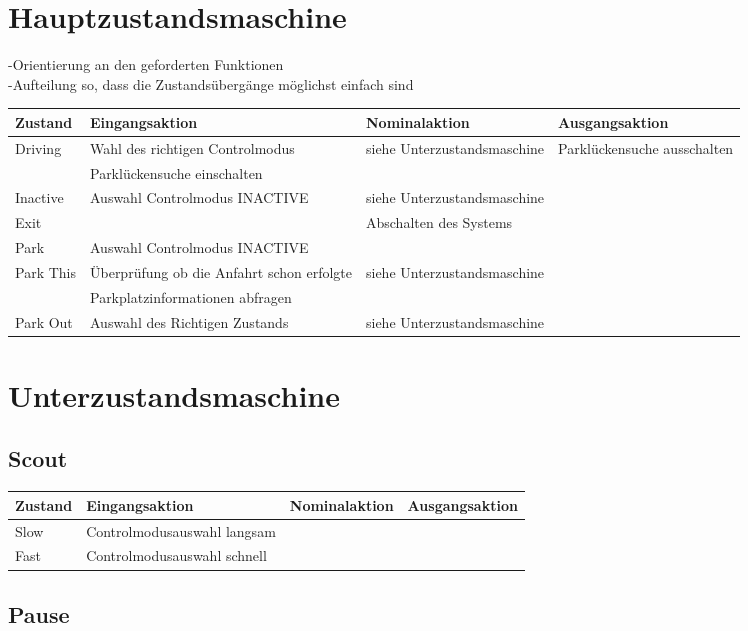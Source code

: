 \section{Hauptzustandsmaschine}
-Orientierung an den geforderten Funktionen\\
-Aufteilung so, dass die Zustandsübergänge möglichst einfach sind\\
%
\begin{tabular}{|p{1.5cm}|p{4cm}|p{4cm}|p{3cm}|}
	\hline 
	Zustand & Eingangsaktion & Nominalaktion & Ausgangsaktion \\ 
	\hline 
	Driving & Wahl des richtigen Controlmodus & siehe Unterzustandsmaschine & Parklückensuche ausschalten \\ 
	\hline 
	 & Parklückensuche einschalten &  &  \\ 
	\hline
	Inactive & Auswahl Controlmodus INACTIVE & siehe Unterzustandsmaschine &  \\ 
	\hline 
	Exit &  & Abschalten des Systems &  \\ 
	\hline
	Park & Auswahl Controlmodus INACTIVE &  &  \\ 
	\hline
	Park This & Überprüfung ob die Anfahrt schon erfolgte & siehe Unterzustandsmaschine &  \\ 
	\hline
	 & Parkplatzinformationen abfragen &  &  \\ 
	\hline
	Park Out & Auswahl des Richtigen Zustands & siehe Unterzustandsmaschine &  \\ 
	\hline 	
\end{tabular} 

\section{Unterzustandsmaschine}

\subsection{Scout}

\begin{tabular}{|p{1.5cm}|p{4cm}|p{4cm}|p{3cm}|}
	\hline 
	Zustand & Eingangsaktion & Nominalaktion & Ausgangsaktion \\ 
	\hline 
	Slow & Controlmodusauswahl langsam &  &  \\ 
	\hline 
	Fast & Controlmodusauswahl schnell &  &  \\ 
	\hline 
\end{tabular} 

\subsection{Pause}

